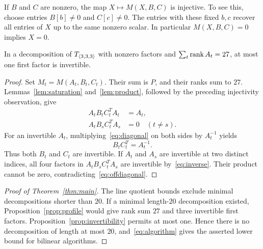 If $B$ and $C$ are nonzero, the map $X\mapsto M(X,B,C)$ is
injective. To see this, choose entries $B[b]\ne0$ and $C[c]\ne0$.
The entries with these fixed $b,c$ recover all entries of $X$ up to
the same nonzero scalar. In particular $M(X,B,C)=0$ implies $X=0$.

\begin{proposition}
\label{prop:invertibility}
In a decomposition of $T_{\langle3,3,3\rangle}$ with nonzero factors and
$\sum_t\operatorname{rank} A_t=27$, at most one first factor is invertible.
\end{proposition}
\begin{proof}
Set $M_t=M(A_t,B_t,C_t)$. Their sum is $P$, and their ranks sum to
$27$. Lemmas~\ref{lem:saturation} and~\ref{lem:product}, followed by
the preceding injectivity observation, give
\begin{align}
 A_tB_tC_t^TA_t&=A_t,\label{eq:diagonal}\\
 A_tB_sC_t^TA_s&=0\quad(t\ne s).\label{eq:offdiagonal}
\end{align}
For an invertible $A_t$, multiplying~\eqref{eq:diagonal} on both
sides by $A_t^{-1}$ yields
\begin{equation}\label{eq:inverse}
 B_tC_t^T=A_t^{-1}.
\end{equation}
Thus both $B_t$ and $C_t$ are invertible. If $A_t$ and $A_s$ are
invertible at two distinct indices, all four factors in
$A_tB_sC_t^TA_s$ are invertible by~\eqref{eq:inverse}. Their product
cannot be zero, contradicting~\eqref{eq:offdiagonal}.
\end{proof}

\begin{proof}[Proof of Theorem~\ref{thm:main}]
The line quotient bounds exclude minimal decompositions shorter than
$20$. If a minimal length-$20$ decomposition existed,
Proposition~\ref{prop:profile} would give rank sum $27$ and three
invertible first factors. Proposition~\ref{prop:invertibility} permits
at most one. Hence there is no decomposition of length at most $20$,
and~\eqref{eq:algorithm} gives the asserted lower bound for bilinear
algorithms.
\end{proof}
